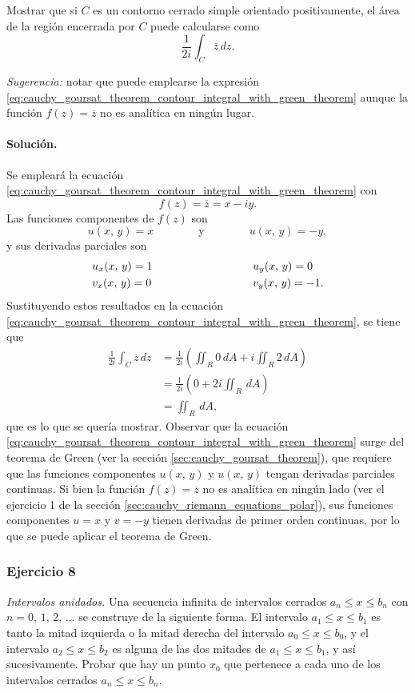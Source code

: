 \documentclass[a4paper]{report}
\begin{document}
Mostrar que si \(C\) es un contorno cerrado simple orientado positivamente, el área de la región encerrada por \(C\) puede calcularse como
\[
 \frac{1}{2i}\int_C\overline{z}\,dz.
\]

\emph{Sugerencia: } notar que puede emplearse la expresión \ref{eq:cauchy_goursat_theorem_contour_integral_with_green_theorem} aunque la función \(f(z)=\overline{z}\) no es analítica en ningún lugar.

\paragraph{Solución.} Se empleará la ecuación \ref{eq:cauchy_goursat_theorem_contour_integral_with_green_theorem} con
\[
 f(z)=\overline{z}=x-iy.
\]
Las funciones componentes de \(f(z)\) son
\[
 u(x,\,y)=x
 \qquad\qquad\textrm{y}\qquad\qquad
 u(x,\,y)=-y,
\]
y sus derivadas parciales son
\[
 \begin{array}{ll}
  u_x(x,\,y)=1\qquad\qquad\qquad\qquad&u_y(x,\,y)=0\\[\smallskipamount]
  v_x(x,\,y)=0\qquad\qquad\qquad\qquad&v_y(x,\,y)=-1.
 \end{array}
\] 
Sustituyendo estos resultados en la ecuación \ref{eq:cauchy_goursat_theorem_contour_integral_with_green_theorem}, se tiene que 
\begin{align*}
 \frac{1}{2i}\int_C \overline{z}\,dz&=\frac{1}{2i}\left(\iint_R0\,dA+i\iint_R2\,dA\right)\\
   &=\frac{1}{2i}\left(0+2i\iint_R\,dA\right)\\
   &=\iint_R\,dA,
\end{align*}
que es lo que se quería mostrar. Observar que la ecuación \ref{eq:cauchy_goursat_theorem_contour_integral_with_green_theorem} surge del teorema de Green (ver la sección \ref{sec:cauchy_goursat_theorem}), que requiere que las funciones componentes \(u(x,\,y)\) y \(u(x,\,y)\) tengan derivadas parciales continuas. Si bien la función \(f(z)=\overline{z}\) no es analítica en ningún lado (ver el ejercicio 1 de la sección \ref{sec:cauchy_riemann_equations_polar}), sus funciones componentes \(u=x\) y \(v=-y\) tienen derivadas de primer orden continuas, por lo que se puede aplicar el teorema de Green.

\subsubsection*{Ejercicio 8}

\emph{Intervalos anidados.} Una secuencia infinita de intervalos cerrados \(a_n\leq x\leq b_n\) con \(n=0,\,1,\,2,\,\dots\) se construye de la siguiente forma. El intervalo \(a_1\leq x\leq b_1\) es tanto la mitad izquierda o la mitad derecha del intervalo \(a_0\leq x\leq b_0\), y el intervalo \(a_2\leq x\leq b_2\) es alguna de las dos mitades de \(a_1\leq x\leq b_1\), y así sucesivamente. Probar que hay un punto \(x_0\) que pertenece a cada uno de los intervalos cerrados \(a_n\leq x\leq b_n\).
\end{document}
